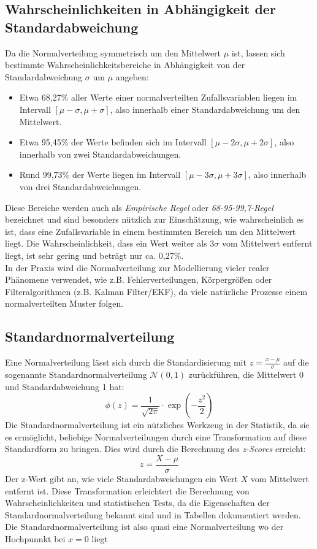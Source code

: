 \subsection*{Wahrscheinlichkeiten in Abhängigkeit der Standardabweichung}

Da die Normalverteilung symmetrisch um den Mittelwert $\mu$ ist, lassen sich bestimmte Wahrscheinlichkeitsbereiche in Abhängigkeit von der Standardabweichung $\sigma$ um $\mu$ angeben:

\begin{itemize}
    \item Etwa 68,27\% aller Werte einer normalverteilten Zufallsvariablen liegen im Intervall $[\mu - \sigma, \mu + \sigma]$, also innerhalb einer Standardabweichung um den Mittelwert.
    \item Etwa 95,45\% der Werte befinden sich im Intervall $[\mu - 2\sigma, \mu + 2\sigma]$, also innerhalb von zwei Standardabweichungen.
    \item Rund 99,73\% der Werte liegen im Intervall $[\mu - 3\sigma, \mu + 3\sigma]$, also innerhalb von drei Standardabweichungen.
\end{itemize}
Diese Bereiche werden auch als \textit{Empirische Regel} oder \textit{68-95-99,7-Regel} bezeichnet und sind besonders nützlich zur Einschätzung, wie wahrscheinlich es ist, dass eine Zufallsvariable in einem bestimmten Bereich um den Mittelwert liegt. Die Wahrscheinlichkeit, dass ein Wert weiter als $3\sigma$ vom Mittelwert entfernt liegt, ist sehr gering und beträgt nur ca. 0,27\%. \\
In der Praxis wird die Normalverteilung zur Modellierung vieler realer Phänomene verwendet, wie z.B. Fehlerverteilungen, Körpergrößen oder Filteralgorithmen (z.B. Kalman Filter/EKF), da viele natürliche Prozesse einem normalverteilten Muster folgen. \cite{skript_statistik} \cite{normaldistribution}


\subsection{Standardnormalverteilung}
\label{sec:standard_normal_distribution}

Eine Normalverteilung lässt sich durch die Standardisierung mit $z = \frac{x - \mu}{\sigma}$ auf die sogenannte Standardnormalverteilung $\mathcal{N}(0, 1)$ zurückführen, die Mittelwert 0 und Standardabweichung 1 hat:
\[
\phi(z) = \frac{1}{\sqrt{2 \pi}} \cdot \exp\left(-\frac{z^2}{2}\right)
\]
Die Standardnormalverteilung ist ein nützliches Werkzeug in der Statistik, da sie es ermöglicht, beliebige Normalverteilungen durch eine Transformation auf diese Standardform zu bringen. Dies wird durch die Berechnung des \textit{z-Scores} erreicht:
\[
z = \frac{X - \mu}{\sigma}
\]
Der z-Wert gibt an, wie viele Standardabweichungen ein Wert \(X\) vom Mittelwert entfernt ist. Diese Transformation erleichtert die Berechnung von Wahrscheinlichkeiten und statistischen Tests, da die Eigenschaften der Standardnormalverteilung bekannt sind und in Tabellen dokumentiert werden.
Die Standardnormalverteilung ist also quasi eine Normalverteilung wo der Hochpunnkt bei $x=0$ liegt

